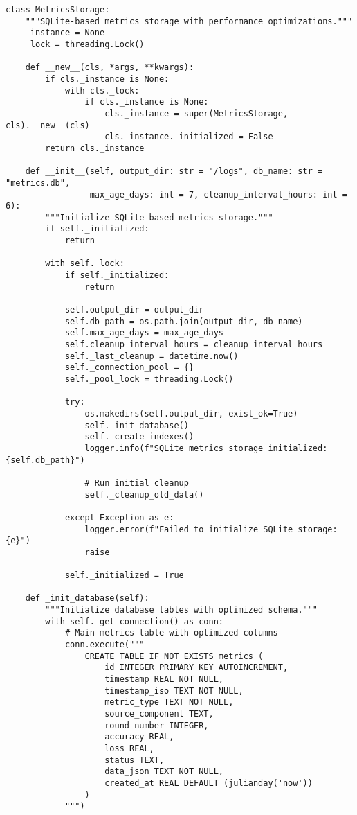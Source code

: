 \begin{lstlisting}[style=pythoncode, caption=Time Series Storage Implementation]
class MetricsStorage:
    """SQLite-based metrics storage with performance optimizations."""
    _instance = None
    _lock = threading.Lock()

    def __new__(cls, *args, **kwargs):
        if cls._instance is None:
            with cls._lock:
                if cls._instance is None:
                    cls._instance = super(MetricsStorage, cls).__new__(cls)
                    cls._instance._initialized = False
        return cls._instance

    def __init__(self, output_dir: str = "/logs", db_name: str = "metrics.db", 
                 max_age_days: int = 7, cleanup_interval_hours: int = 6):
        """Initialize SQLite-based metrics storage."""
        if self._initialized:
            return

        with self._lock:
            if self._initialized:
                return

            self.output_dir = output_dir
            self.db_path = os.path.join(output_dir, db_name)
            self.max_age_days = max_age_days
            self.cleanup_interval_hours = cleanup_interval_hours
            self._last_cleanup = datetime.now()
            self._connection_pool = {}
            self._pool_lock = threading.Lock()

            try:
                os.makedirs(self.output_dir, exist_ok=True)
                self._init_database()
                self._create_indexes()
                logger.info(f"SQLite metrics storage initialized: {self.db_path}")
                
                # Run initial cleanup
                self._cleanup_old_data()
                
            except Exception as e:
                logger.error(f"Failed to initialize SQLite storage: {e}")
                raise

            self._initialized = True

    def _init_database(self):
        """Initialize database tables with optimized schema."""
        with self._get_connection() as conn:
            # Main metrics table with optimized columns
            conn.execute("""
                CREATE TABLE IF NOT EXISTS metrics (
                    id INTEGER PRIMARY KEY AUTOINCREMENT,
                    timestamp REAL NOT NULL,
                    timestamp_iso TEXT NOT NULL,
                    metric_type TEXT NOT NULL,
                    source_component TEXT,
                    round_number INTEGER,
                    accuracy REAL,
                    loss REAL,
                    status TEXT,
                    data_json TEXT NOT NULL,
                    created_at REAL DEFAULT (julianday('now'))
                )
            """)
            

\end{lstlisting}
